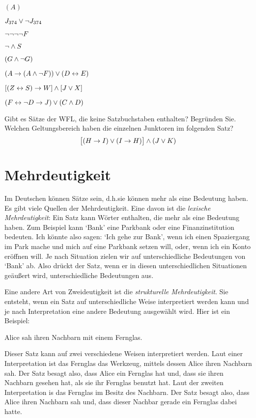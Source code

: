 \begin{earg}
\item $(A)$
\item $J_{374} \vee \neg J_{374}$
\item $\neg \neg \neg \neg F$
\item $\neg \wedge S$
\item $(G \wedge \neg G)$
\item $(A \rightarrow (A \wedge \neg F)) \vee (D \leftrightarrow E)$
\item $[(Z \leftrightarrow S) \rightarrow W] \wedge [J \vee X]$
\item $(F \leftrightarrow \neg D \rightarrow J) \vee (C \wedge D)$
\end{earg}

\problempart
Gibt es Sätze der WFL, die keine Satzbuchstaben enthalten? Begründen Sie.\\

\problempart
Welchen Geltungsbereich haben die einzelnen Junktoren im folgenden Satz?
$$\bigl[(H \rightarrow I) \vee (I \rightarrow H)\bigr] \wedge (J \vee K)$$

\chapter{Mehrdeutigkeit}\label{s:AbmbiguityTFL}

Im Deutschen können Sätze  sein, d.h.\@ sie können mehr als eine Bedeutung haben. Es gibt viele Quellen der Mehrdeutigkeit. Eine davon ist die \emph{lexische Mehrdeutigkeit}: Ein Satz kann Wörter enthalten, die mehr als eine Bedeutung haben. Zum Beispiel kann `Bank' eine Parkbank oder eine Finanzinstitution bedeuten. Ich könnte also sagen: `Ich gehe zur Bank', wenn ich einen Spaziergang im Park mache und mich auf eine Parkbank setzen will, oder, wenn ich ein Konto eröffnen will.  Je nach Situation zielen wir auf unterschiedliche Bedeutungen von `Bank' ab. Also drückt der Satz, wenn er in diesen unterschiedlichen Situationen geäu{\ss}ert wird, unterschiedliche Bedeutungen aus.

Eine andere Art von Zweideutigkeit ist die \emph{strukturelle Mehrdeutigkeit}. Sie entsteht, wenn ein Satz auf unterschiedliche Weise interpretiert werden kann und je nach Interpretation eine andere Bedeutung ausgewählt wird. Hier ist ein Beispiel:
\begin{earg}
	\item[] Alice sah ihren Nachbarn mit einem Fernglas.
\end{earg}
Dieser Satz kann auf zwei verschiedene Weisen interpretiert werden. Laut einer Interpretation ist das Fernglas das Werkzeug, mittels dessen Alice ihren Nachbarn sah. Der Satz besagt also, dass Alice ein Fernglas hat und, dass sie ihren Nachbarn gesehen hat, als sie ihr Fernglas benutzt hat. Laut der zweiten Interpretation is das Fernglas im Besitz des Nachbarn. Der Satz besagt also, dass Alice ihren Nachbarn sah und, dass dieser Nachbar gerade ein Fernglas dabei hatte.

